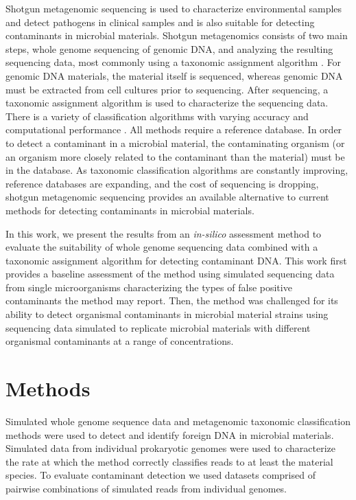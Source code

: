 \documentclass[fleqn,10pt,lineno]{wlpeerj}\usepackage[]{graphicx}\usepackage[]{color}
\begin{document}
Shotgun metagenomic sequencing is used to characterize environmental samples and detect pathogens in clinical samples and is also suitable for detecting contaminants in microbial materials. 
Shotgun metagenomics consists of two main steps, whole genome sequencing of genomic DNA, and analyzing the resulting sequencing data, most commonly using a taxonomic assignment algorithm \citep{Thomas2012}. 
For genomic DNA materials, the material itself is sequenced, whereas genomic DNA must be extracted from cell cultures prior to sequencing. 
After sequencing, a taxonomic assignment algorithm is used to characterize the sequencing data. 
There is a variety of classification algorithms with varying accuracy and computational performance \citep{Bazinet2012,menzel2016fast}.
All methods require a reference database.
In order to detect a contaminant in a microbial material, the contaminating organism (or an organism more closely related to the contaminant than the material) must be in the database. 
As taxonomic classification algorithms are constantly improving, reference databases are expanding, and the cost of sequencing is dropping, shotgun metagenomic sequencing provides an available alternative to current methods for detecting contaminants in microbial materials.

In this work, we present the results from an \textit{in-silico} assessment method to evaluate the suitability of whole genome sequencing data combined with a taxonomic assignment algorithm for detecting contaminant DNA.
This work first provides a baseline assessment of the method using simulated sequencing data from single microorganisms characterizing the types of false positive contaminants the method may report.
Then, the method was challenged for its ability to detect organismal contaminants in microbial material strains using sequencing data simulated to replicate microbial materials with different organismal contaminants at a range of concentrations.

\section*{Methods}
Simulated whole genome sequence data and metagenomic taxonomic classification methods were used to detect and identify foreign DNA in microbial materials. 
Simulated data from individual prokaryotic genomes were used to characterize the rate at which the method correctly classifies reads to at least the material species.
To evaluate contaminant detection we used datasets comprised of pairwise combinations of simulated reads from individual genomes.  
\end{document}
